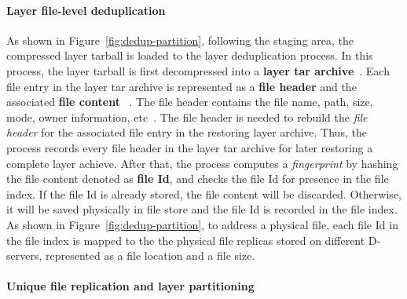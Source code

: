\paragraph{Layer file-level deduplication}
As shown in Figure~\ref{fig:dedup-partition}, 
following the staging area, 
the compressed layer tarball is loaded to the layer deduplication process.
In this process, 
the layer tarball is first decompressed into a \textbf{layer tar archive}~\cite{xxx}.
Each file entry in the layer tar archive is represented as a \textbf{file header} and the associated \textbf{file content}
~\cite{xxx}.
The file header contains the file name, path, size, mode, owner information, etc~\cite{xxx}.
The file header is needed to rebuild the \emph{file header} for 
the associated file entry in the restoring layer archive.
Thus, 
the process records every file header in the layer tar archive for later restoring a complete layer achieve. 
After that,
the process computes a \emph{fingerprint} by hashing the file content denoted as \textbf{file Id}, 
and checks the file Id for presence in the file index.
If the file Id is already stored, the file content will be discarded. 
Otherwise, it will be saved physically in file store and 
the file Id is recorded in the file index.
As shown in Figure~\ref{fig:dedup-partition}, 
to address a physical file, 
each file Id in the file index is mapped to the
% 
%
%
the physical file replicas stored on different D-servers,
represented as
a file location and a file size.

\paragraph{Unique file replication and layer partitioning}

